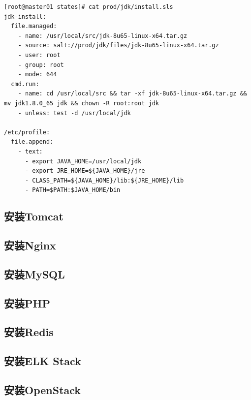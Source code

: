 \begin{verbatim}
[root@master01 states]# cat prod/jdk/install.sls 
jdk-install:
  file.managed:
    - name: /usr/local/src/jdk-8u65-linux-x64.tar.gz
    - source: salt://prod/jdk/files/jdk-8u65-linux-x64.tar.gz
    - user: root
    - group: root
    - mode: 644
  cmd.run:
    - name: cd /usr/local/src && tar -xf jdk-8u65-linux-x64.tar.gz && mv jdk1.8.0_65 jdk && chown -R root:root jdk
    - unless: test -d /usr/local/jdk

/etc/profile:
  file.append:
    - text:
      - export JAVA_HOME=/usr/local/jdk
      - export JRE_HOME=${JAVA_HOME}/jre
      - CLASS_PATH=${JAVA_HOME}/lib:${JRE_HOME}/lib
      - PATH=$PATH:$JAVA_HOME/bin
\end{verbatim}

\subsection{安装Tomcat}
\label{sec:saltInstallTomcat}

\subsection{安装Nginx}
\label{sec:saltInstallNginx}

\subsection{安装MySQL}
\label{saltInstallMySQL}

\subsection{安装PHP}
\label{sec:saltInstallPHP}

\subsection{安装Redis}
\label{sec:saltInstallRedis}

\subsection{安装ELK Stack}
\label{sec:saltInstallELK}

\subsection{安装OpenStack}
\label{sec:saltInstallOpenStack}


